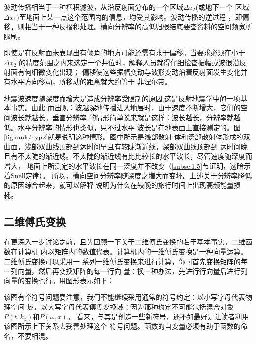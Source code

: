 波动传播相当于一种褶积滤波，从沿反射面分布的一个区域$\Delta x_{2}$(或地下一个
区域$\Delta x_{1}$)至地面上某一点这个范围内的信息，均受其影响。波动传播的逆过程
，即偏移，则相当于一种反褶积处理。横向分辨率的高低归根结底要查资料的空间频宽所限制。

即使是在反射面未表现出有倾角的地方可能还需有求于偏移。当要求必须在小于$\Delta x_{2}$
的精度范围之内来选定一个井位时，解释人员就得仔细检查振幅或波很沿反射面有何细微变化出现；
偏移使这些振幅变动与波形变动沿着反射面发生变化并有水平方向移动，所移动的距离就大约等于
菲涅尔带。

地震波速度随深度而增大是造成分辨率受限制的原因,这是反射地震学中的一项基本事实。由此
而出现：波越深地传播进入地层时，由于速度不断增大，它们的空间波长就越长。垂直分辨率
的情形简单说来就是这样：波长越长，分辨率就越低。水平分辨率的情形也类似，只不过水平
波长是在地表面上直接测定的。图\ref{fig:omk/hyp2}就是说明这种情形。图中所示是浅部散射
体和深部散射体形成的双曲面，浅部双曲线顶部到达时间早且有较陡渐近线，深部双曲线顶部到
达时间晚且有不太陡的渐近线。不太陡的渐近线有比比较长的水平波长，尽管速度随深度而增大，
地面上所测定的水平波长在同一深度并不改变（\ref{subse:1.5}节证明，这暗示着Snell定律）。
所以，横向空间分辨率随深度之増大而变坏。上述关于分辨率降低的原因综合起来，就可以解释
说明为什么在较晚的旅行时间上出现高频能量损耗。

\subsection{二维傅氏变换}
在更深入一步讨论之前，且先回顾一下关于二维傅氏变换的若干基本事实。二维函数在计算机
内以矩阵内的数值代表。计算机内的一维傅氏变换是一种向量运算。二维傅氏变换可以采用一
系列一维傅氏变换来进行计算，你可首先变换矩阵的每一列向量，然后再变换矩阵的每一行向
量：换一种办法，先进行行向量后进行列向量的变换也行。用图形表示如下：


该图有个符号问题要注意，我们不能继续采用通常的符号约定：以小写字母代表物理空间
域，以大写字母代表傅氏变换域：因为那种约定不可能包括混合对象$P(t,k_{x})$和$P(\omega,x)$。
看来，与其是创造一些新符号，还不如最好是让读者利用该图所示上下关系去妥善处理这个
符号问题。函数的自变量必须有助于函数的命名，不要相混。

